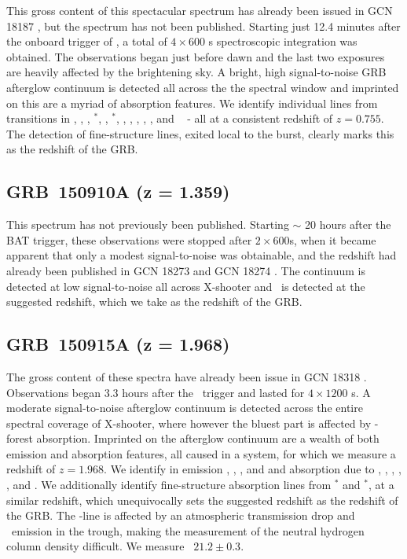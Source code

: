 \documentclass{aa}    %
\begin{document}
This gross content of this spectacular spectrum has already been issued in GCN
18187 \citep{GCN18187}, but the spectrum has not been published. Starting just
12.4 minutes after the onboard trigger of \swift, a total of $4 \times 600$ s
spectroscopic integration was obtained. The observations began just before dawn
and the last two exposures are heavily affected by the brightening sky. A
bright, high signal-to-noise GRB afterglow continuum is detected all across the
the spectral window and imprinted on this are a myriad of absorption features.
We identify individual lines from transitions in \aliii, \crii, \znii,
\NIii$^*$, \feii, \feii$^*$, \scii, \mnii, \mgii, \mgi, \TIii, and  \caii~ - all
at a consistent redshift of $z = 0.755$. The detection of fine-structure lines,
exited local to the burst, clearly marks this as the redshift of the GRB.

\subsection{GRB~150910A (z = 1.359)}\label{150910}

This spectrum has not previously been published. Starting $\sim$ 20 hours after
the BAT trigger, these observations were stopped after $2 \times 600$s, when it
became apparent that only a modest signal-to-noise was obtainable, and the
redshift had already been published in GCN 18273 \citep{GCN18273} and GCN 18274
\citep{GCN18274}. The continuum is detected at low signal-to-noise all across
X-shooter and \mgii~is detected at the suggested redshift, which we take as the
redshift of the GRB.

\subsection{GRB~150915A (z = 1.968)}\label{150915}

The gross content of these spectra have already been issue in GCN 18318
\citep{GCN18318}. Observations began 3.3 hours after the \swift~trigger and
lasted for $4 \times 1200$ s. A moderate signal-to-noise afterglow continuum is
detected across the entire spectral coverage of X-shooter, where however the
bluest part is affected by \lya-forest absorption. Imprinted on the afterglow
continuum are a wealth of both emission and absorption features, all caused in a
system, for which we measure a redshift of $z = 1.968$. We identify in emission
\oii, \hb, \oiii, and \ha and absorption due to \lya, \civ, \alii, \SIii, \feii,
and \mgii. We additionally identify fine-structure absorption lines from
\SIii$^*$ and \feii$^*$, at a similar redshift, which unequivocally sets the
suggested redshift as the redshift of the GRB. The \lya-line is affected by an
atmospheric transmission drop and \lya~emission in the trough, making the
measurement of the neutral hydrogen column density difficult. We measure
\nh~$21.2 \pm 0.3$.
\end{document}
